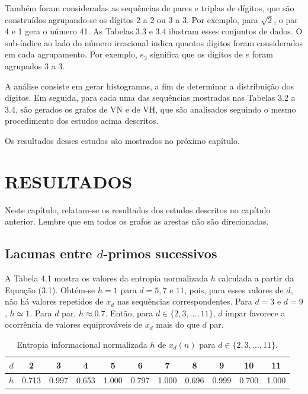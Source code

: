 \documentclass[12pt,a4paper,fleqn]{report}
\begin{document}
Também foram consideradas as sequências de pares e triplas de dígitos, que são construídos
agrupando-se os dígitos 2 a 2 ou 3 a 3. Por exemplo, para $\sqrt{2}$, o par
4 e 1 gera o número 41. As Tabelas 3.3 e 3.4 ilustram esses conjuntos de dados. O sub-índice ao lado do número irracional indica quantos dígitos foram considerados em cada agrupamento. Por exemplo, $e_3$ significa que os dígitos de $e$ foram agrupados 3 a 3.

A análise consiste em gerar histogramas, a fim de determinar
a distribuição dos dígitos. Em seguida, para cada uma das
sequências mostradas nas Tabelas 3.2 a 3.4, são gerados os grafos de VN e de VH, que são analisados seguindo o mesmo procedimento dos estudos acima descritos.


Os resultados desses estudos são mostrados no próximo capítulo.


\chapter{RESULTADOS}

Neste capítulo, relatam-se os resultados dos estudos descritos no capítulo anterior. 
Lembre que em todos os grafos as arestas não são direcionadas.


\section{Lacunas entre $d$-primos sucessivos}

A Tabela 4.1 mostra os valores da entropia normalizada $h$ calculada a partir da Equação (3.1). Obtém-se  $h = 1$ para $d=5, 7$ e $11$, 
pois, para esses valores de $d$, não há valores repetidos de $x_d$ nas sequências
correspondentes.
Para $d=3$ e $d=9$, $h \simeq 1$. Para $d$ par, $h \approx 0.7$. Então,
para $d \in \{2, 3, \ldots, 11\}$, $d$ ímpar favorece a ocorrência de valores equiprováveis de $x_d$
mais do que $d$ par.

\begin{table}[ht]
\begin{center}
\caption{Entropia informacional normalizada $h$ de $x_d(n)$ para
$d \in \{2, 3, \ldots, 11\}$.}

\begin{tabular}{|c|c|c|c|c|c|c|c|c|c|c|} \hline
        $d$ & 2 & 3 & 4 & 5 & 6 & 7 & 8 & 9 & 10 & 11\\ \hline
        $h$ & 0.713 & 0.997 & 0.653 & 1.000 & 0.797 & 1.000 & 0.696 &
        0.999 & 0.700 & 1.000\\
        \hline
    \end{tabular}
    \label{entropies}
\end{center}
\end{table}
\end{document}
